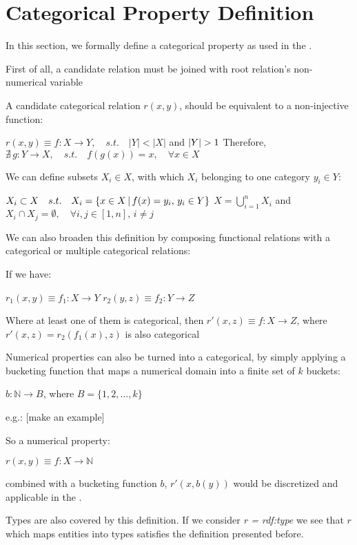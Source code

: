 \section{Categorical Property Definition}

In this section, we formally define a categorical property as used in the \graphname. 

First of all, a candidate relation must be joined with root relation's non-numerical variable

A candidate categorical relation $r(x,y)$, should be equivalent to a non-injective function:

$r(x,y) \equiv f : X \rightarrow Y , \quad s.t. \quad |Y|<|X| $ and $ |Y|>1 \newline $
Therefore, $\nexists \, g : Y \rightarrow X , \quad s.t. \quad f(g(x))=x , \quad \forall x \in X$

We can define subsets $X_i \in X$, with which $X_i$ belonging to one category $y_i \in Y$:

$X_i \subset X \quad s.t. \quad X_i = \{x \in X \,|\, f(x)=y_i ,\, y_i \in Y\} \newline $
$X = \bigcup_{i=1}^{n} X_i $ and $ X_i \cap X_j = \emptyset ,\quad \forall i,j \in [1,n] ,\, i \neq j$

We can also broaden this definition by composing functional relations with a categorical or multiple categorical
relations:

If we have:

$r_1(x,y) \equiv f_1 : X \rightarrow Y$ \newline
$r_2(y,z) \equiv f_2 : Y \rightarrow Z$ 

Where at least one of them is categorical, then $r'(x,z) \equiv f : X \rightarrow Z$, where $r'(x,z)=r_2(f_1(x),z)$ is also categorical


Numerical properties can also be turned into a categorical, by simply applying a bucketing function that maps a
numerical domain into a finite set of $k$ buckets:

$b: \mathbb{N} \rightarrow B$, where $B=\{1,2,\dots ,k \}$

e.g.: [make an example]

So a numerical property:

$r(x,y) \equiv f : X \rightarrow \mathbb{N}$ 

combined with a bucketing function $b$, $r'(x,b(y))$ would be discretized and applicable in the \graphname.

Types are also covered by this definition. If we consider \emph{r = rdf:type} we see that $r$ which maps entities into
types satisfies the definition presented before.

